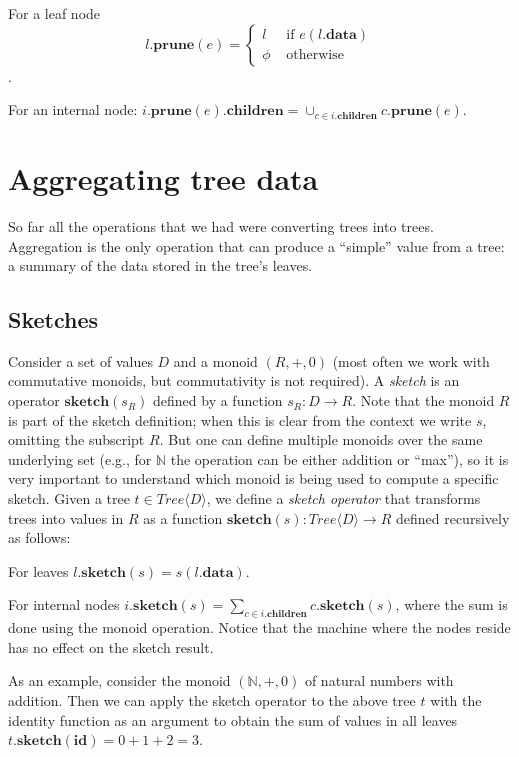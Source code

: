 \documentclass{article}
\newcommand{\tree}[1]{\mathit{Tree}\langle #1 \rangle}
\newcommand{\mr}[1]{\ensuremath{\mathrm{\mathbf{#1}}}}
\newcommand{\N}{\ensuremath{\mathbb{N}}\xspace}
\begin{document}
For a leaf node \[l.\mr{prune}(e) =
\begin{cases}
  l & \mbox{ if } e(l.\mr{data}) \\
  \phi & \mbox { otherwise}
\end{cases}
\].

For an internal node: $i.\mr{prune}(e).\mr{children} = \cup_{c \in i.\mr{children}} c.\mr{prune}(e)$.

\section{Aggregating tree data}

So far all the operations that we had were converting trees into
trees.  Aggregation is the only operation that can produce a
``simple'' value from a tree: a summary of the data stored in the
tree's leaves.

\subsection{Sketches}

Consider a set of values $D$ and a monoid $(R, +, 0)$ (most often we
work with commutative monoids, but commutativity is not required).  A
\emph{sketch} is an operator $\mr{sketch}(s_R)$ defined by a function
$s_R : D \rightarrow R$.  Note that the monoid $R$ is part of the
sketch definition; when this is clear from the context we write $s$,
omitting the subscript $R$.  But one can define multiple monoids over
the same underlying set (e.g., for $\N$ the operation can be either
addition or ``max''), so it is very important to understand which
monoid is being used to compute a specific sketch.  Given a tree $t
\in \tree{D}$, we define a \emph{sketch operator} that transforms
trees into values in $R$ as a function $\mr{sketch}(s) : \tree{D}
\rightarrow R$ defined recursively as follows:

For leaves $l.\mr{sketch}(s) = s(l.\mr{data})$.

For internal nodes $i.\mr{sketch}(s) = \sum_{c \in i.\mr{children}}
c.\mr{sketch}(s)$, where the sum is done using the monoid operation.
Notice that the machine where the nodes reside has no effect on the
sketch result.

As an example, consider the monoid $(\N, +, 0)$ of natural numbers
with addition.  Then we can apply the sketch operator to the above
tree $t$ with the identity function as an argument to obtain the sum
of values in all leaves $t.\mr{sketch}(\mr{id}) = 0 + 1 + 2 = 3$.
\end{document}
